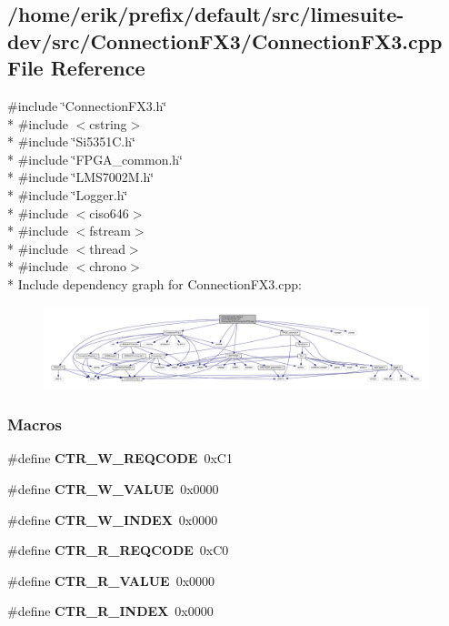 \subsection{/home/erik/prefix/default/src/limesuite-\/dev/src/\+Connection\+F\+X3/\+Connection\+F\+X3.cpp File Reference}
\label{ConnectionFX3_8cpp}
{\ttfamily \#include \char`\"{}Connection\+F\+X3.\+h\char`\"{}}\\*
{\ttfamily \#include $<$cstring$>$}\\*
{\ttfamily \#include \char`\"{}Si5351\+C.\+h\char`\"{}}\\*
{\ttfamily \#include \char`\"{}F\+P\+G\+A\+\_\+common.\+h\char`\"{}}\\*
{\ttfamily \#include \char`\"{}L\+M\+S7002\+M.\+h\char`\"{}}\\*
{\ttfamily \#include \char`\"{}Logger.\+h\char`\"{}}\\*
{\ttfamily \#include $<$ciso646$>$}\\*
{\ttfamily \#include $<$fstream$>$}\\*
{\ttfamily \#include $<$thread$>$}\\*
{\ttfamily \#include $<$chrono$>$}\\*
Include dependency graph for Connection\+F\+X3.\+cpp\+:
\nopagebreak
\begin{figure}[H]
\begin{center}
\leavevmode
\includegraphics[width=350pt]{d6/dc5/ConnectionFX3_8cpp__incl}
\end{center}
\end{figure}
\subsubsection*{Macros}
\begin{DoxyCompactItemize}
\item 
\#define {\bf C\+T\+R\+\_\+\+W\+\_\+\+R\+E\+Q\+C\+O\+DE}~0x\+C1
\item 
\#define {\bf C\+T\+R\+\_\+\+W\+\_\+\+V\+A\+L\+UE}~0x0000
\item 
\#define {\bf C\+T\+R\+\_\+\+W\+\_\+\+I\+N\+D\+EX}~0x0000
\item 
\#define {\bf C\+T\+R\+\_\+\+R\+\_\+\+R\+E\+Q\+C\+O\+DE}~0x\+C0
\item 
\#define {\bf C\+T\+R\+\_\+\+R\+\_\+\+V\+A\+L\+UE}~0x0000
\item 
\#define {\bf C\+T\+R\+\_\+\+R\+\_\+\+I\+N\+D\+EX}~0x0000
\end{DoxyCompactItemize}


